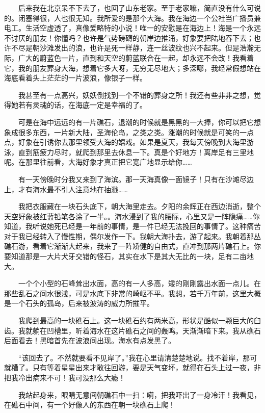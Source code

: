  
 　　后来我在北京呆不下去了，也回了山东老家。至于老家嘛，简直没有什么可说的。闭塞得很，人也很无知。我所爱的是那个大海。我在海边一个公社当广播员兼电工。生活空虚透了，真像爱略特的小说！唯一的安慰是在海边上！海是一个永远不讨厌的朋友！你懂吗？也许是气势磅礴的朝岸边推涌，好象要把陆地吞下去；也许不尽是朝沙滩发出的浪，也许是死一样静，连一丝波纹也兴不起来。但是浩瀚无际，广大的蔚蓝色一片，直到和天空的蔚蓝联合在一起，却永远不会改！我看着它，我的朋友葬身大海，想着它多大呀，无穷无尽地大；多深哪，我经常假想站在海底看着头上茫茫的一片波浪，像银子一样。 
 
 　　我甚至有一点高兴，妖妖倒找到一个不错的葬身之所！我还有些非非之想，觉得她若有灵魂的话，在海底一定是幸福的了。 
 
 　　可是在海中远远的有一片礁石，退潮的时候就是黑黑的一大捧，你可以把它想象成很多东西，一片新大陆，圣海伦岛，之类之类。涨潮的时候就是可笑的一点点，好象在引诱你去那里领受大海的嬉戏。如果是夏天，我每天傍晚到大海里游泳，直到筋疲力尽时，就爬到那里去休息一下。真是个好地方！离岸足有三里地呢。在那里往前看，大海好象才真正把它宽广地显示给你…… 
 
 　　有一天傍晚时分我又来到了海滨。那一天海真像一面镜子！只有在沙滩尽边上，才有海水最不引人注意地在抽溅…… 
 
 　　我把衣服藏在一块石头底下，朝大海里走去。夕阳的余辉正在西边消逝，整个天空好象被红蓝铅笔各涂了一半。。海水浸到了我的腰际，心里又是一阵隐痛……你知道，我听说她死已经是一年前的事情，是一件已经无法挽回的事情了。这种痛苦对于我已经转入了慢性期，偶尔发作一下。我朝大海扑去，游了起来。我朝着那丛礁石游，看着它渐渐大起来，我来了一阵矫健的自由式，直冲到那两片礁石上。你要知道那是一大片犬牙交错的怪石，其实在水下是其大无比的一块，足有二亩地大。 
 
 　　一个个小型的石峰耸出水面，高的有一人多高，矮的刚刚露出水面一点儿。在那些乱石之间水很浅，可是水底下非常的崎岖不平。我想，若千万年前，这里大概是一个石头的孤岛，后来被波涛的威力所摧平。 
 
 　　我爬到最高的一块礁石上。这一块礁石约有两米高，形状是酷似一颗巨大的臼齿。我就躺在凹槽里，听着海水在这片礁石之间的轰鸣。天渐渐暗下来。我从礁石后面看去！黑暗首先在波浪间出现。海水有点发黑了。 
 
 　　“该回去了。不然就要看不见岸了。”我在心里请清楚楚地说。找不着岸，那可就糟了。只有等着星星出来才敢往回游，要是天气变坏，就得在石头上过一夜，非把我冷出病来不可！我可没那么大瘾！ 
 
 　　我站起身来，眼睛无意间朝礁石中一扫：嗬，把我吓出了一身冷汗！我看见，在礁石中间，有一个好像人的东西在朝一块礁石上爬！ 
 
